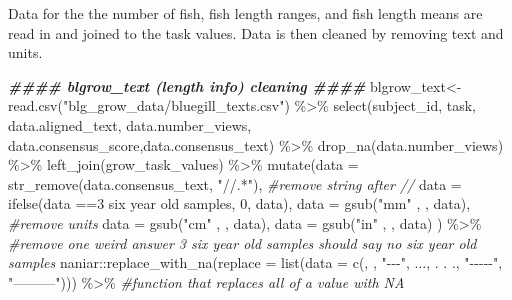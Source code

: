 \documentclass[
]{article}
\newenvironment{Shaded}{\begin{snugshade}}{\end{snugshade}}
\newcommand{\AttributeTok}[1]{\textcolor[rgb]{0.77,0.63,0.00}{#1}}
\newcommand{\CommentTok}[1]{\textcolor[rgb]{0.56,0.35,0.01}{\textit{#1}}}
\newcommand{\DecValTok}[1]{\textcolor[rgb]{0.00,0.00,0.81}{#1}}
\newcommand{\DocumentationTok}[1]{\textcolor[rgb]{0.56,0.35,0.01}{\textbf{\textit{#1}}}}
\newcommand{\FunctionTok}[1]{\textcolor[rgb]{0.00,0.00,0.00}{#1}}
\newcommand{\NormalTok}[1]{#1}
\newcommand{\OtherTok}[1]{\textcolor[rgb]{0.56,0.35,0.01}{#1}}
\newcommand{\SpecialCharTok}[1]{\textcolor[rgb]{0.00,0.00,0.00}{#1}}
\newcommand{\StringTok}[1]{\textcolor[rgb]{0.31,0.60,0.02}{#1}}
\begin{document}
Data for the the number of fish, fish length ranges, and fish length
means are read in and joined to the task values. Data is then cleaned by
removing text and units.

\begin{Shaded}
\begin{Highlighting}[]
\DocumentationTok{\#\#\#\# blgrow\_text (length info) cleaning \#\#\#\#}
\NormalTok{blgrow\_text}\OtherTok{\textless{}{-}}\FunctionTok{read.csv}\NormalTok{(}\StringTok{"blg\_grow\_data/bluegill\_texts.csv"}\NormalTok{) }\SpecialCharTok{\%\textgreater{}\%}
  \FunctionTok{select}\NormalTok{(subject\_id, task, }\StringTok{\textquotesingle{}data.aligned\_text\textquotesingle{}}\NormalTok{, }\StringTok{\textquotesingle{}data.number\_views\textquotesingle{}}\NormalTok{, }\StringTok{\textquotesingle{}data.consensus\_score\textquotesingle{}}\NormalTok{,}\StringTok{\textquotesingle{}data.consensus\_text\textquotesingle{}}\NormalTok{) }\SpecialCharTok{\%\textgreater{}\%}
  \FunctionTok{drop\_na}\NormalTok{(}\StringTok{\textquotesingle{}data.number\_views\textquotesingle{}}\NormalTok{) }\SpecialCharTok{\%\textgreater{}\%} 
  \FunctionTok{left\_join}\NormalTok{(grow\_task\_values) }\SpecialCharTok{\%\textgreater{}\%} 
  \FunctionTok{mutate}\NormalTok{(}\AttributeTok{data =} \FunctionTok{str\_remove}\NormalTok{(data.consensus\_text, }\StringTok{"//.*"}\NormalTok{), }\CommentTok{\#remove string after // }
         \AttributeTok{data =} \FunctionTok{ifelse}\NormalTok{(data }\SpecialCharTok{==}\StringTok{\textquotesingle{}3 six year old samples\textquotesingle{}}\NormalTok{, }\DecValTok{0}\NormalTok{, data), }
         \AttributeTok{data =} \FunctionTok{gsub}\NormalTok{(}\StringTok{"mm"}\NormalTok{ , }\StringTok{\textquotesingle{}\textquotesingle{}}\NormalTok{, data), }\CommentTok{\#remove units}
         \AttributeTok{data =} \FunctionTok{gsub}\NormalTok{(}\StringTok{"cm"}\NormalTok{ , }\StringTok{\textquotesingle{}\textquotesingle{}}\NormalTok{, data), }
         \AttributeTok{data =} \FunctionTok{gsub}\NormalTok{(}\StringTok{"in"}\NormalTok{ , }\StringTok{\textquotesingle{}\textquotesingle{}}\NormalTok{, data)}
\NormalTok{         ) }\SpecialCharTok{\%\textgreater{}\%} \CommentTok{\#remove one weird answer \textquotesingle{}3 six year old samples\textquotesingle{} should say \textquotesingle{}no six year old samples\textquotesingle{} }
\NormalTok{  naniar}\SpecialCharTok{::}\FunctionTok{replace\_with\_na}\NormalTok{(}\AttributeTok{replace =} \FunctionTok{list}\NormalTok{(}\AttributeTok{data =} \FunctionTok{c}\NormalTok{(}\StringTok{\textquotesingle{}{-}\textquotesingle{}}\NormalTok{, }\StringTok{\textquotesingle{}{-}{-}\textquotesingle{}}\NormalTok{, }\StringTok{"{-}{-}{-}"}\NormalTok{, }\StringTok{\textquotesingle{}...\textquotesingle{}}\NormalTok{, }\StringTok{\textquotesingle{}. . .\textquotesingle{}}\NormalTok{, }\StringTok{"{-}{-}{-}{-}{-}"}\NormalTok{, }\StringTok{"———"}\NormalTok{))) }\SpecialCharTok{\%\textgreater{}\%} \CommentTok{\#function that replaces all of a value with NA }

\end{Highlighting}
\end{Shaded}
\end{document}

